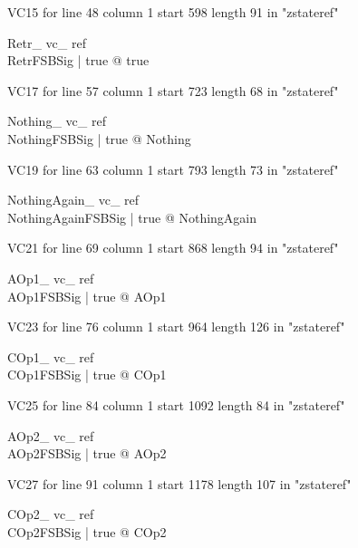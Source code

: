 \documentclass{article}
\begin{document}
VC15 for line 48 column 1 start 598 length 91 in "zstateref"
\begin{theorem}{ Retr\_ vc\_ ref}\\
 \exists RetrFSBSig | true @ true \\

\end{theorem}

VC17 for line 57 column 1 start 723 length 68 in "zstateref"
\begin{theorem}{ Nothing\_ vc\_ ref}\\
 \forall NothingFSBSig | true @ \pre Nothing \\

\end{theorem}

VC19 for line 63 column 1 start 793 length 73 in "zstateref"
\begin{theorem}{ NothingAgain\_ vc\_ ref}\\
 \forall NothingAgainFSBSig | true @ \pre NothingAgain \\

\end{theorem}

VC21 for line 69 column 1 start 868 length 94 in "zstateref"
\begin{theorem}{ AOp1\_ vc\_ ref}\\
 \forall AOp1FSBSig | true @ \pre AOp1 \\

\end{theorem}

VC23 for line 76 column 1 start 964 length 126 in "zstateref"
\begin{theorem}{ COp1\_ vc\_ ref}\\
 \forall COp1FSBSig | true @ \pre COp1 \\

\end{theorem}

VC25 for line 84 column 1 start 1092 length 84 in "zstateref"
\begin{theorem}{ AOp2\_ vc\_ ref}\\
 \forall AOp2FSBSig | true @ \pre AOp2 \\

\end{theorem}

VC27 for line 91 column 1 start 1178 length 107 in "zstateref"
\begin{theorem}{ COp2\_ vc\_ ref}\\
 \forall COp2FSBSig | true @ \pre COp2 \\

\end{theorem}
\end{document}
